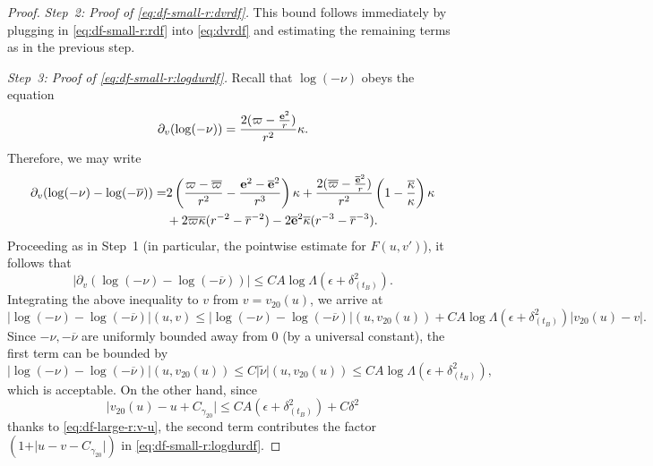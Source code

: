 \documentclass[10pt, reqno]{amsart}
\theoremstyle{definition}
\theoremstyle{remark}
\theoremstyle{conjecture}
\numberwithin{equation}{section}
\newcommand{\abs}[1]{\vert#1\vert}
\newcommand{\rd}{\partial}
\newcommand{\0}{\emptyset}
\newcommand{\gmm}{\gamma}
\newcommand{\dlt}{\delta}
\newcommand{\eps}{\epsilon}
\newcommand{\kpp}{\kappa}
\newcommand{\lmb}{\lambda}
\newcommand{\Lmb}{\Lambda}
\newcommand{\bfe}{{\bf e}}
\newcommand{\dur}{\nu}
\newcommand{\dvr}{\lmb}
\newcommand{\de}{\delta}
\newcommand{\pfstep}[1]{\vspace{.5em} {\it \noindent #1.}}
\newcommand{\e}{\bfe}							%
\newcommand{\durbg}{\overline{\dur}}				%
\newcommand{\rbg}{\overline{r}}					%
\newcommand{\varpibg}{\overline{\varpi}}				%
\newcommand{\kppbg}{\overline{\kpp}}					%
\newcommand{\ebg}{\overline{\e}}					%
\newcommand{\durdf}{\widetilde{\dur}}				%
\begin{document}
\begin{proof}
\pfstep{Step~2: Proof of \eqref{eq:df-small-r:dvrdf}} 
This bound follows immediately by plugging in \eqref{eq:df-small-r:rdf} into \eqref{eq:dvrdf} and estimating the remaining terms as in the previous step. 

\pfstep{Step~3: Proof of \eqref{eq:df-small-r:logdurdf}} Recall that $\log (-\dur)$ obeys the equation
\begin{equation*}
	\rd_{v} (\log (-\dur)) = \frac{2 (\varpi - \frac{\e^{2}}{r})}{r^{2}} \kpp.
\end{equation*}
Therefore, we may write
\begin{align*}
	\rd_{v} (\log (-\dur) - \log(-\durbg))
	= & 2 \left(\frac{\varpi- \varpibg}{r^{2}} - \frac{\e^{2} - \ebg^{2}}{r^{3}} \right) \kpp + \frac{2 (\varpibg - \frac{\ebg^{2}}{r})}{r^{2}} \left( 1 - \frac{\kppbg}{\kpp} \right) \kpp \\
	& + 2 \varpibg \kppbg (r^{-2} - \rbg^{-2}) - 2 \ebg^{2} \kppbg (r^{-3} - \rbg^{-3}).
\end{align*}
Proceeding as in Step~1 (in particular, the pointwise estimate for $F(u, v')$), it follows that
\begin{equation*}
	\abs{\rd_{v} (\log (-\dur) - \log(-\durbg))} \leq C A \log \Lmb \left( \eps + \dlt_{(t_{B})}^{2} \right).
\end{equation*}
Integrating the above inequality to $v$ from $v= v_{20}(u)$, we arrive at 
\begin{equation*}
	\abs{\log (-\dur) - \log(-\durbg)}(u, v)
	\leq \abs{\log (-\dur) - \log(-\durbg)}(u, v_{20}(u)) + C A \log \Lmb \left( \eps + \dlt_{(t_{B})}^{2} \right) \abs{v_{20}(u) - v}.
\end{equation*}
Since $-\dur, -\durbg$ are uniformly bounded away from $0$ (by a universal constant), the first term can be bounded by
\begin{equation*}
\abs{\log (-\dur) - \log(-\durbg)}(u, v_{20}(u)) \leq C \abs{\durdf}(u, v_{20}(u)) \leq  C A \log \Lmb \left( \eps + \dlt_{(t_{B})}^{2}\right),
\end{equation*}
which is acceptable. On the other hand, since
\begin{equation*} 
	\abs{v_{20}(u) - u + C_{\gmm_{20}}} \leq C A \left( \eps + \dlt_{(t_{B})}^{2} \right)  + C\de^2
\end{equation*}
thanks to \eqref{eq:df-large-r:v-u}, the second term contributes the factor $(1 + \abs{u - v - C_{\gmm_{20}}})$ in \eqref{eq:df-small-r:logdurdf}.


\end{proof}
\end{document}
